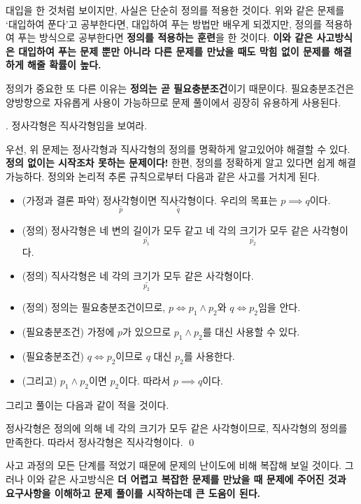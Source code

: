 대입을 한 것처럼 보이지만, 사실은 단순히 정의를 적용한 것이다. 위와 같은 문제를 `대입하여 푼다'고 공부한다면, 대입하여 푸는 방법만 배우게 되겠지만, 정의를 적용하여 푸는 방식으로 공부한다면 \textbf{정의를 적용하는 훈련}을 한 것이다. \textbf{이와 같은 사고방식은 대입하여 푸는 문제 뿐만 아니라 다른 문제를 만났을 때도 막힘 없이 문제를 해결하게 해줄 확률이 높다.}

정의가 중요한 또 다른 이유는 \textbf{정의는 곧 필요충분조건}이기 때문이다. 필요충분조건은 양방향으로 자유롭게 사용이 가능하므로 문제 풀이에서 굉장히 유용하게 사용된다.

\bigskip

\ex. 정사각형은 직사각형임을 보여라.

\pagebreak

우선, 위 문제는 정사각형과 직사각형의 정의를 명확하게 알고있어야 해결할 수 있다. \textbf{정의 없이는 시작조차 못하는 문제이다!} 한편, 정의를 정확하게 알고 있다면 쉽게 해결 가능하다. 정의와 논리적 추론 규칙으로부터 다음과 같은 사고를 거치게 된다.

\begin{itemize}
    \item (가정과 결론 파악) \(\underset{p}{\underline{\text{정사각형}}}\)이면 \(\underset{q}{\underline{\text{직사각형}}}\)이다. 우리의 목표는 \(p \implies q\)이다.
    \item (정의) 정사각형은 \(\underset{p_1}{\underline{\text{네 변의 길이가 모두 같}}}\)고 \(\underset{p_2}{\underline{\text{네 각의 크기가 모두 같}}}\)은 사각형이다.
    \item (정의) 직사각형은 \(\underset{p_2}{\underline{\text{네 각의 크기가 모두 같}}}\)은 사각형이다.
    \item (정의) 정의는 필요충분조건이므로, \(p \iff p_1 \wedge p_2\)와 \(q \iff p_2\)임을 안다.
    \item (필요충분조건) 가정에 \(p\)가 있으므로 \(p_1 \wedge p_2\)를 대신 사용할 수 있다.
    \item (필요충분조건) \(q \iff p_2\)이므로 \(q\) 대신 \(p_2\)를 사용한다.
    \item (그리고) \(p_1 \wedge p_2\)이면 \(p_2\)이다. 따라서 \(p \implies q\)이다.
\end{itemize}

그리고 풀이는 다음과 같이 적을 것이다.

\pf 정사각형은 정의에 의해 네 각의 크기가 모두 같은 사각형이므로, 직사각형의 정의를 만족한다. 따라서 정사각형은 직사각형이다. \qed

사고 과정의 모든 단계를 적었기 때문에 문제의 난이도에 비해 복잡해 보일 것이다. 그러나 이와 같은 사고방식은 \textbf{더 어렵고 복잡한 문제를 만났을 때 문제에 주어진 것과 요구사항을 이해하고 문제 풀이를 시작하는데 큰 도움이 된다.}

